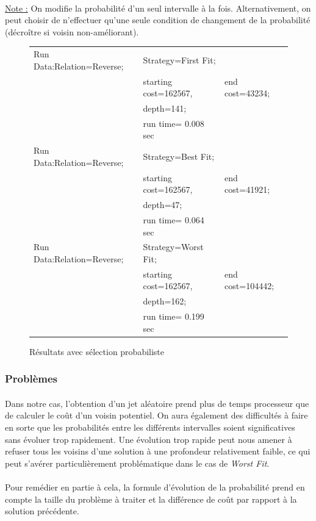 \documentclass[a4paper,10pt]{report}
\begin{document}
\paragraph{}
\underline{Note :} On modifie la probabilité d'un seul intervalle à la fois.
Alternativement, on peut choisir de n'effectuer qu'une seule condition de
changement de la probabilité (décroître si voisin non-améliorant).


\begin{figure}[h]
 \begin{tabular}{lll}
  Run Data:Relation=Reverse;&
    Strategy=First Fit;\\
    &starting cost=162567,&
    end cost=43234;\\
    &depth=141;\\
    &run time= 0.008 sec\\
  Run Data:Relation=Reverse;&
    Strategy=Best Fit;\\
    &starting cost=162567,&
    end cost=41921;\\
    &depth=47;\\
    &run time= 0.064 sec\\
  Run Data:Relation=Reverse;&
    Strategy=Worst Fit;\\
    &starting cost=162567,&
    end cost=104442;\\
    &depth=162;\\
    &run time= 0.199 sec\\
 \end{tabular}
 \caption{Résultats avec sélection probabiliste}
\end{figure}


\subsubsection{Problèmes}

\paragraph{}
  Dans notre cas, l'obtention d'un jet aléatoire prend plus de temps processeur
que de calculer le coût d'un voisin potentiel. On aura également des difficultés
à faire en sorte que les probabilités entre les différents intervalles soient
significatives sans évoluer trop rapidement. Une évolution trop rapide peut nous
amener à refuser tous les voisins d'une solution à une profondeur relativement
faible, ce qui peut s'avérer particulièrement problématique dans le cas de
\textit{Worst Fit}.
\paragraph{}
  Pour remédier en partie à cela, la formule d'évolution de la probabilité prend
en compte la taille du problème à traiter et la différence de coût par rapport à
la solution précédente.
\end{document}
